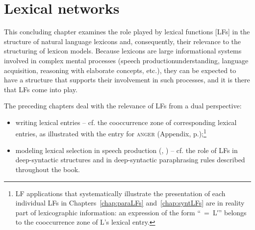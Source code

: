 
\chapter{Lexical networks}\label{chap:lexicalNetwork}

This concluding chapter examines the role played by lexical functions [LFs] in the structure of natural language lexicons and, consequently, their relevance to the structuring of lexicon models. Because lexicons are large informational systems involved in complex mental processes (speech production\slashs{}understanding, language acquisition, reasoning with elaborate concepts, etc.), they can be expected to have a structure that supports their involvement in such processes, and it is there that LFs come into play.

The preceding chapters deal with the relevance of LFs from a dual perspective:

\begin{itemize}

\item writing lexical entries -- cf. the cooccurrence zone of corresponding lexical entries, as illustrated with the entry for \textsc{anger} (Appendix, p.\thinspace\pageref{chap:appendix1});\footnote{LF applications that systematically illustrate the presentation of each individual LFs in Chapters~\ref{chap:paraLFs} and~\ref{chap:syntLFs} are in reality part of lexicographic information: an expression of the form ``~=~L′\thinspace'' belongs to the cooccurrence zone of L's lexical entry.}

\item modeling lexical selection in speech production (, ) -- cf. the role of LFs in deep-syntactic structures and in deep-syntactic paraphrasing rules described throughout the book.

\end{itemize}

